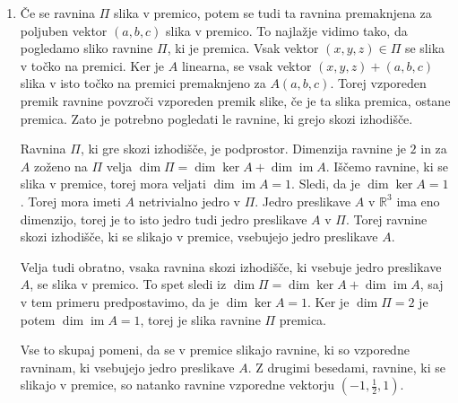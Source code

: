 \documentclass[a4,11pt]{article}
\newcommand{\R}{\mathbb{R}}
\DeclareMathOperator{\im}{im}
\begin{document}
\begin{enumerate}[label=(\alph*)]
    
    \item Če se ravnina \(\Pi\) slika v premico, potem se tudi ta ravnina premaknjena
        za poljuben vektor \(\left(a, b, c\right)\) slika v premico. To najlažje vidimo tako, da
        pogledamo sliko ravnine \(\Pi\), ki je premica. Vsak vektor \(\left(x, y, z\right) \in \Pi\) se slika
        v točko na premici. Ker je \(A\) linearna, se vsak vektor \(\left(x, y, z\right) + \left(a, b, c\right)\) slika v 
        isto točko na premici premaknjeno za \(A\left(a, b, c\right)\). Torej vzporeden premik 
        ravnine povzroči vzporeden premik slike, če je ta slika premica, ostane premica.
        Zato je potrebno pogledati le ravnine, ki grejo skozi izhodišče.

        Ravnina \(\Pi\), ki gre skozi izhodišče, je podprostor.
        Dimenzija ravnine je \(2\) in za \(A\) zoženo na \(\Pi\) velja \(\dim \Pi = \dim \ker A + \dim \im A\).
        Iščemo ravnine, ki se slika v premice, torej mora veljati \(\dim \im A = 1\).
        Sledi, da je \(\dim \ker A = 1\). Torej mora imeti \(A\) netrivialno jedro v \(\Pi\).
        Jedro preslikave \(A\) v \(\R^3\) ima eno dimenzijo, torej je to isto jedro tudi jedro 
        preslikave \(A\) v \(\Pi\). Torej ravnine skozi izhodišče, ki se slikajo v premice,
        vsebujejo jedro preslikave \(A\).

        Velja tudi obratno, vsaka ravnina skozi izhodišče, ki vsebuje jedro preslikave \(A\),
        se slika v premico. To spet sledi iz \(\dim \Pi = \dim \ker A + \dim \im A\), saj v 
        tem primeru predpostavimo, da je \(\dim \ker A = 1\). Ker je \(\dim \Pi = 2\) je potem
        \(\dim \im A = 1\), torej je slika ravnine \(\Pi\) premica.

        Vse to skupaj pomeni, da se v premice slikajo ravnine, ki so vzporedne ravninam,
        ki vsebujejo jedro preslikave \(A\). Z drugimi besedami, ravnine, ki se slikajo v premice,
        so natanko ravnine vzporedne vektorju \((-1, \frac{1}{2}, 1)\).
\end{enumerate}
\end{document}
